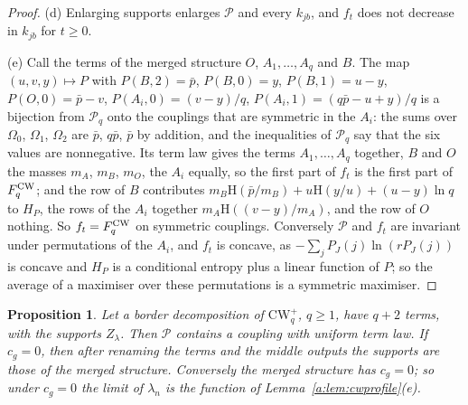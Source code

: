 \documentclass[11pt]{article}
\newtheorem{proposition}[theorem]{Proposition}
\theoremstyle{definition}
\theoremstyle{remark}
\newcommand{\Hh}{\mathrm{H}}
\begin{document}
\begin{proof}
(d) Enlarging supports enlarges $\mathcal P$ and every $k_{jb}$, and $f_t$ does not decrease in $k_{jb}$ for $t\ge0$.

(e) Call the terms of the merged structure $O$, $A_1,\dots,A_q$ and $B$. The map $(u,v,y)\mapsto P$ with $P(B,2)=\bar p$, $P(B,0)=y$, $P(B,1)=u-y$, $P(O,0)=\bar p-v$, $P(A_i,0)=(v-y)/q$, $P(A_i,1)=(q\bar p-u+y)/q$ is a bijection from $\mathcal P_q$ onto the couplings that are symmetric in the $A_i$: the sums over $\Omega_0$, $\Omega_1$, $\Omega_2$ are $\bar p$, $q\bar p$, $\bar p$ by addition, and the inequalities of $\mathcal P_q$ say that the six values are nonnegative. Its term law gives the terms $A_1,\dots,A_q$ together, $B$ and $O$ the masses $m_A$, $m_B$, $m_O$, the $A_i$ equally, so the first part of $f_t$ is the first part of $F^{\rm CW}_q$; and the row of $B$ contributes $m_B\Hh(\bar p/m_B)+u\Hh(y/u)+(u-y)\ln q$ to $H_P$, the rows of the $A_i$ together $m_A\Hh((v-y)/m_A)$, and the row of $O$ nothing. So $f_t=F^{\rm CW}_q$ on symmetric couplings. Conversely $\mathcal P$ and $f_t$ are invariant under permutations of the $A_i$, and $f_t$ is concave, as $-\sum_jP_J(j)\ln(rP_J(j))$ is concave and $H_P$ is a conditional entropy plus a linear function of $P$; so the average of a maximiser over these permutations is a symmetric maximiser.
\end{proof}

\begin{proposition}\label{a:prop:cwmerged}
Let a border decomposition of $\mathrm{CW}^+_q$, $q\ge1$, have $q+2$ terms, with the supports $Z_\lambda$. Then $\mathcal P$ contains a coupling with uniform term law. If $c_g=0$, then after renaming the terms and the middle outputs the supports are those of the merged structure. Conversely the merged structure has $c_g=0$; so under $c_g=0$ the limit of $\lambda_n$ is the function of Lemma~\ref{a:lem:cwprofile}(e).
\end{proposition}
\end{document}
